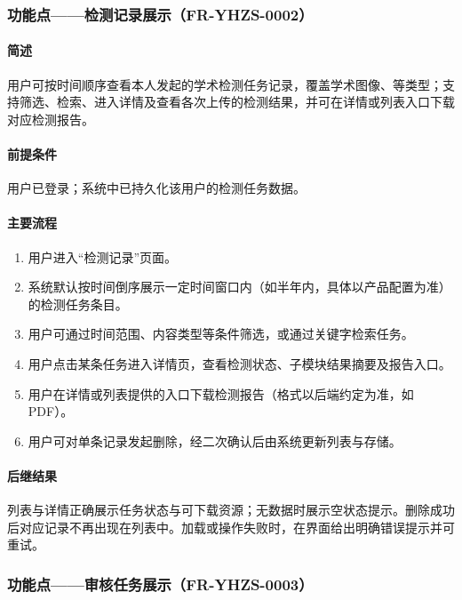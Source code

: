 \subsubsection{功能点——检测记录展示（FR-YHZS-0002）}

\paragraph*{简述}

用户可按时间顺序查看本人发起的学术检测任务记录，覆盖学术图像、等类型；支持筛选、检索、进入详情及查看各次上传的检测结果，并可在详情或列表入口下载对应检测报告。

\paragraph*{前提条件}

用户已登录；系统中已持久化该用户的检测任务数据。

\paragraph*{主要流程}

\begin{enumerate}
    \item 用户进入“检测记录”页面。
    \item 系统默认按时间倒序展示一定时间窗口内（如半年内，具体以产品配置为准）的检测任务条目。
    \item 用户可通过时间范围、内容类型等条件筛选，或通过关键字检索任务。
    \item 用户点击某条任务进入详情页，查看检测状态、子模块结果摘要及报告入口。
    \item 用户在详情或列表提供的入口下载检测报告（格式以后端约定为准，如 PDF）。
    \item 用户可对单条记录发起删除，经二次确认后由系统更新列表与存储。
\end{enumerate}

\paragraph*{后继结果}

列表与详情正确展示任务状态与可下载资源；无数据时展示空状态提示。删除成功后对应记录不再出现在列表中。加载或操作失败时，在界面给出明确错误提示并可重试。

\subsubsection{功能点——审核任务展示（FR-YHZS-0003）}

